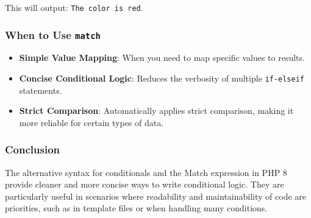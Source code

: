 \documentclass[11pt]{article}
\begin{document}
This will output: \texttt{The color is red}.

\subsubsection{When to Use \texttt{match}}
\label{sec:org41edecd}
\begin{itemize}
\item \textbf{Simple Value Mapping}: When you need to map specific values to
results.
\item \textbf{Concise Conditional Logic}: Reduces the verbosity of multiple
\texttt{if-elseif} statements.
\item \textbf{Strict Comparison}: Automatically applies strict comparison, making
it more reliable for certain types of data.
\end{itemize}

\subsubsection{Conclusion}
\label{sec:org5840ada}
The alternative syntax for conditionals and the Match expression in PHP
8 provide cleaner and more concise ways to write conditional logic. They
are particularly useful in scenarios where readability and
maintainability of code are priorities, such as in template files or
when handling many conditions.
\end{document}
